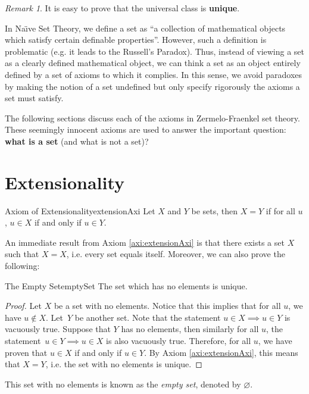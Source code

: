 \documentclass[math]{amznotes}
\theoremstyle{remark}
\newtheorem*{remark}{Remark}
\begin{document}
\begin{notebox}
    \begin{remark}
        It is easy to prove that the universal class is \textbf{unique}.
    \end{remark}
\end{notebox}
In Na\"\i ve Set Theory, we define a set as ``a collection of mathematical objects which satisfy certain definable properties''. However, such a definition is problematic (e.g. it leads to the Russell's Paradox). Thus, instead of viewing a set as a clearly defined mathematical object, we can think a set as an object entirely defined by a set of axioms to which it complies. In this sense, we avoid paradoxes by making the notion of a set undefined but only specify rigorously the axioms a set must satisfy. 

The following sections discuss each of the axioms in Zermelo-Fraenkel set theory. These seemingly innocent axioms are used to answer the important question: \textbf{what is a set} (and what is not a set)?
\section{Extensionality}
\begin{axibox}{Axiom of Extensionality}{extensionAxi}
    Let $X$ and $Y$ be sets, then $X = Y$ if for all $u$, $u \in X$ if and only if $u \in Y$.
\end{axibox}
An immediate result from Axiom \ref{axi:extensionAxi} is that there exists a set $X$ such that $X = X$, i.e. every set equals itself. Moreover, we can also prove the following:
\begin{thmbox}{The Empty Set}{emptySet}
    The set which has no elements is unique.
    \tcblower   
    \begin{proof}
        Let $X$ be a set with no elements. Notice that this implies that for all $u$, we have $u \notin X$. Let~$Y$ be another set. Note that the statement $u \in X \implies u \in Y$ is vacuously true. Suppose that $Y$ has no elements, then similarly for all $u$, the statement~$u \in Y \implies u \in X$ is also vacuously true. Therefore, for all $u$, we have proven that $u \in X$ if and only if $u \in Y$. By Axiom \ref{axi:extensionAxi}, this means that $X = Y$, i.e. the set with no elements is unique.
    \end{proof}
\end{thmbox}
This set with no elements is known as the \textit{empty set}, denoted by $\varnothing$.
\end{document}
